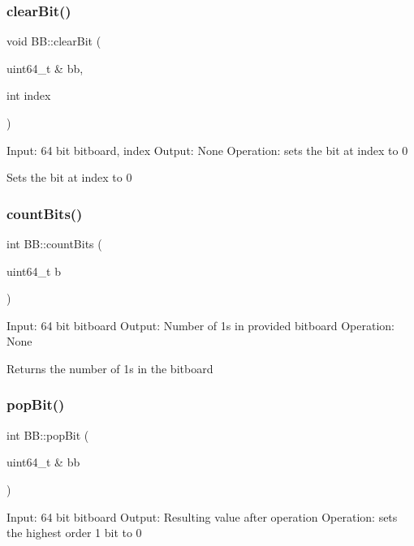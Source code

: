 \subsubsection{\texorpdfstring{clear\+Bit()}{clearBit()}}
{\footnotesize\ttfamily void B\+B\+::clear\+Bit (\begin{DoxyParamCaption}\item[{uint64\+\_\+t \&}]{bb,  }\item[{int}]{index }\end{DoxyParamCaption})\hspace{0.3cm}{\ttfamily [noexcept]}}

Input\+: 64 bit bitboard, index Output\+: None Operation\+: sets the bit at index to 0

Sets the bit at index to 0 \mbox{\label{namespaceBB_ae9ac6d5ba9f117b648a13a99374e13b9}} 
\subsubsection{\texorpdfstring{count\+Bits()}{countBits()}}
{\footnotesize\ttfamily int B\+B\+::count\+Bits (\begin{DoxyParamCaption}\item[{uint64\+\_\+t}]{b }\end{DoxyParamCaption})\hspace{0.3cm}{\ttfamily [noexcept]}}

Input\+: 64 bit bitboard Output\+: Number of 1\textquotesingle{}s in provided bitboard Operation\+: None

Returns the number of 1\textquotesingle{}s in the bitboard \mbox{\label{namespaceBB_a947400d855a9c4b3e62433637ec18f4b}} 
\subsubsection{\texorpdfstring{pop\+Bit()}{popBit()}}
{\footnotesize\ttfamily int B\+B\+::pop\+Bit (\begin{DoxyParamCaption}\item[{uint64\+\_\+t \&}]{bb }\end{DoxyParamCaption})\hspace{0.3cm}{\ttfamily [noexcept]}}

Input\+: 64 bit bitboard Output\+: Resulting value after operation Operation\+: sets the highest order 1 bit to 0

